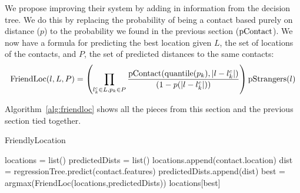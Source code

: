 We propose improving their system by adding in information from the decision
tree.
%
We do this by replacing the probability of being a contact based purely on
distance ($p$) to the probability we found in the previous section
($\operatorname{pContact}$).
%
We now have a formula for predicting the best location given $L$, the set of
locations of the contacts, and $P$, the set of predicted distances to the same
contacts:
\[
    \operatorname{FriendLoc}(l,L,P) =
        \left(
            \prod_{l^c_k \in L,p_k \in P}
            {\operatorname{pContact}(\operatorname{quantile}(p_k),|l-l^c_k|) \over (1-p(|l-l^c_k|))}
        \right)
        \operatorname{pStrangers}(l)
\]

Algorithm~\ref{alg:friendloc} shows all the pieces from this section and the
previous section tied together.

\begin{algorithm}
  \caption{FriendlyLocation \label{alg:friendloc}}
  \begin{algorithmic}[0]
  \State locations = list()
  \State predictedDists = list()
        \State \Continue
      \EndIf
      \State locations.append(contact.location)
      \State dist = regressionTree.predict(contact.features)
      \State predictedDists.append(dist)
  \EndFor
  \State best = argmax(FriendLoc(locations,predictedDists))
  \State \Return locations[best]
  \end{algorithmic}
\end{algorithm}



